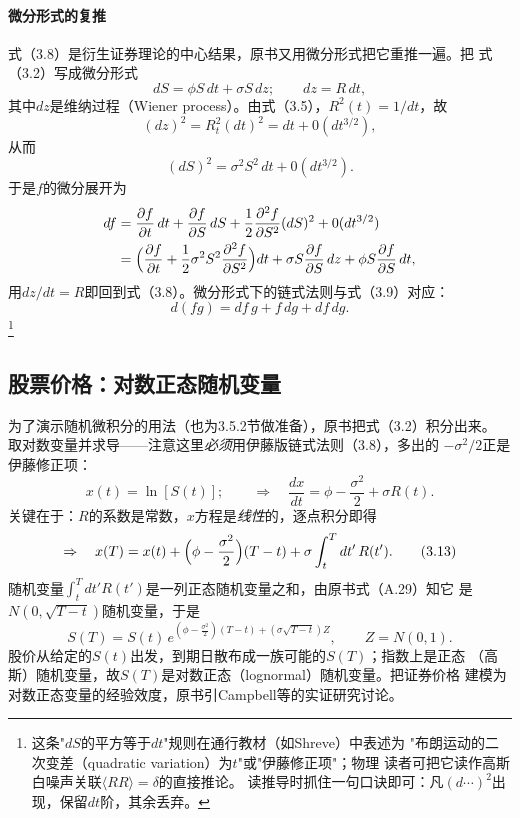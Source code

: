 \paragraph{微分形式的复推}
式（3.8）是衍生证券理论的中心结果，原书又用微分形式把它重推一遍。把
式（3.2）写成微分形式
\begin{equation*}
dS=\phi S\,dt+\sigma S\,dz;\qquad dz=R\,dt,
\tag{3.10}
\end{equation*}
其中$dz$是维纳过程（Wiener process）。由式（3.5），$R^{2}(t)=1/dt$，故
\begin{equation*}
(dz)^{2}=R_t^{2}(dt)^{2}=dt+0(dt^{3/2}),
\end{equation*}
从而
\begin{equation*}
(dS)^{2}=\sigma^{2}S^{2}\,dt+0(dt^{3/2}).
\end{equation*}
于是$f$的微分展开为
\begin{align*}
df&=\frac{\partial f}{\partial t}\,dt+\frac{\partial f}{\partial S}\,dS
+\frac{1}{2}\frac{\partial^{2}f}{\partial S^{2}}(dS)^{2}+0(dt^{3/2})\\
&=\Bigl(\frac{\partial f}{\partial t}
+\frac{1}{2}\sigma^{2}S^{2}\frac{\partial^{2}f}{\partial S^{2}}\Bigr)dt
+\sigma S\frac{\partial f}{\partial S}\,dz
+\phi S\frac{\partial f}{\partial S}\,dt,
\end{align*}
用$dz/dt=R$即回到式（3.8）。微分形式下的链式法则与式（3.9）对应：
\begin{equation*}
d(fg)=df\,g+f\,dg+df\,dg.
\end{equation*}
\footnote{这条"$dS$的平方等于$d t$"规则在通行教材（如Shreve）中表述为
"布朗运动的二次变差（quadratic variation）为$t$"或"伊藤修正项"；物理
读者可把它读作高斯白噪声关联$\langle R R\rangle=\delta$的直接推论。
读推导时抓住一句口诀即可：凡$(d\cdots)^{2}$出现，保留$d t$阶，其余丢弃。}

\subsection*{股票价格：对数正态随机变量}

为了演示随机微积分的用法（也为3.5.2节做准备），原书把式（3.2）积分出来。
取对数变量并求导——注意这里\emph{必须}用伊藤版链式法则（3.8），多出的
$-\sigma^{2}/2$正是伊藤修正项：
\begin{equation*}
x(t)=\ln[S(t)];\qquad\Rightarrow\quad
\frac{dx}{dt}=\phi-\frac{\sigma^{2}}{2}+\sigma R(t).
\tag{3.12}
\end{equation*}
关键在于：$R$的系数是常数，$x$方程是\emph{线性}的，逐点积分即得
\begin{equation*}
\Rightarrow\quad
x(T)=x(t)+\Bigl(\phi-\frac{\sigma^{2}}{2}\Bigr)(T-t)
+\sigma\int_{t}^{T}dt'\,R(t').
\tag{3.13}
\end{equation*}
随机变量$\int_t^T dt' R(t')$是一列正态随机变量之和，由原书式（A.29）知它
是$N(0,\sqrt{T-t})$随机变量，于是
\begin{equation*}
S(T)=S(t)\,e^{(\phi-\frac{\sigma^{2}}{2})(T-t)+(\sigma\sqrt{T-t})Z},
\qquad Z=N(0,1).
\tag{3.14}
\end{equation*}
股价从给定的$S(t)$出发，到期日散布成一族可能的$S(T)$；指数上是正态
（高斯）随机变量，故$S(T)$是对数正态（lognormal）随机变量。把证券价格
建模为对数正态变量的经验效度，原书引Campbell等的实证研究讨论。

